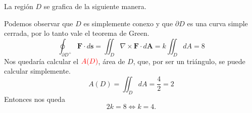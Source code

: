 \begin{solution}
    La regi\'on $D$ se grafica de la siguiente manera.

    \begin{center}
    \end{center}


    Podemos observar que $D$ es simplemente conexo y que $\partial D$ es una curva simple cerrada, por lo tanto vale el teorema de Green.
    \[
        \oint_{\partial D^+} \mathbf{F}\cdot d\mathbf{s}=\iint_D \nabla\times\mathbf{F}\cdot d\mathbf{A}=k\iint_DdA=8
    \]
    Nos quedar\'ia calcular el  $\textcolor{red}{A(D)}$,  \'area de $D$, que, por ser un tri\'angulo, se puede calcular simplemente.
    \[
        A(D) = \iint_D dA=\frac{4}{2}=2
    \]
    Entonces nos queda
    \[
        2k=8\iff k=4.
    \]
\end{solution}